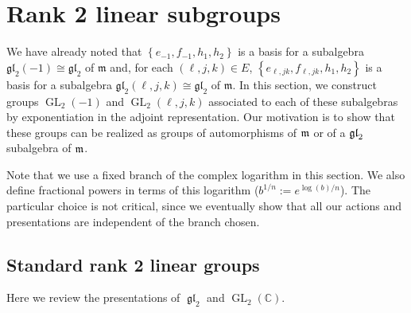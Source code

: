 \documentclass[11pt,letterpaper]{amsart}
\numberwithin{thecounter}{section}
\theoremstyle{definition}
\DeclareMathOperator{\GL}{GL}
\DeclareMathOperator{\gl}{\mathfrak{gl}}
\newcommand{\C}{{\mathbb C}}
\begin{document}
\section{Rank 2 linear subgroups}\label{S-gl2}
We have already noted that $\left\{e_{-1},f_{-1},h_1,h_2\right\}$ is a basis for a subalgebra $\mathfrak{gl}_2(-1)\cong \mathfrak{gl}_2$ of $\mathfrak m$ and, for each $(\ell,j,k)\in E$,  $\left\{e_{\ell,jk},f_{\ell,jk},h_1,h_2 \right\}$ is a basis for a subalgebra 
$\mathfrak{gl}_2(\ell,j,k)\cong \mathfrak{gl}_2$ of $\mathfrak m$. 
In this section, we construct groups $\GL_2(-1)$ and $\GL_2(\ell,j,k)$ associated to each of these subalgebras by exponentiation in the adjoint representation. %
Our motivation is to show  that these groups can be realized as groups of automorphisms of $\frak m$ or of a $\frak{gl}_2$ subalgebra of $\frak m$.

Note that we use a fixed branch of the complex logarithm in this section. 
We also define fractional powers in terms of this logarithm ($b^{1/n} := e^{\log(b)/n}$). 
The particular choice is not critical, since we eventually show that all our actions and presentations are independent of the branch chosen.

\subsection{Standard rank 2 linear groups}\label{SS-stdgl2}
Here we review the presentations of $\gl_2$ and $\GL_2(\C)$.
\end{document}
